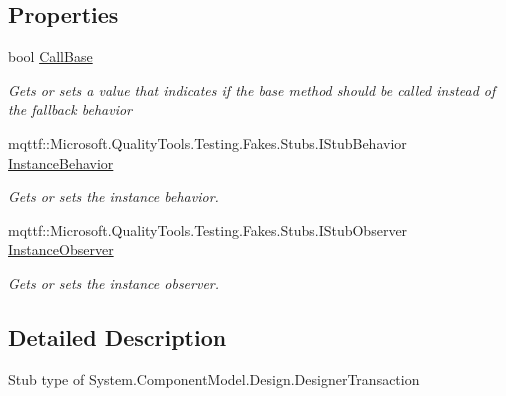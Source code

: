 \subsection*{Properties}
\begin{DoxyCompactItemize}
\item 
bool \hyperlink{class_system_1_1_component_model_1_1_design_1_1_fakes_1_1_stub_designer_transaction_ae23758d21a9026faa0e72d2decfb97fd}{Call\-Base}
\begin{DoxyCompactList}\small\item\em Gets or sets a value that indicates if the base method should be called instead of the fallback behavior\end{DoxyCompactList}\item 
mqttf\-::\-Microsoft.\-Quality\-Tools.\-Testing.\-Fakes.\-Stubs.\-I\-Stub\-Behavior \hyperlink{class_system_1_1_component_model_1_1_design_1_1_fakes_1_1_stub_designer_transaction_abd8526f281b84ad0eefe75ae77ac53ca}{Instance\-Behavior}
\begin{DoxyCompactList}\small\item\em Gets or sets the instance behavior.\end{DoxyCompactList}\item 
mqttf\-::\-Microsoft.\-Quality\-Tools.\-Testing.\-Fakes.\-Stubs.\-I\-Stub\-Observer \hyperlink{class_system_1_1_component_model_1_1_design_1_1_fakes_1_1_stub_designer_transaction_a7621b3c8d10cde8b59d09eb7f789ed7c}{Instance\-Observer}
\begin{DoxyCompactList}\small\item\em Gets or sets the instance observer.\end{DoxyCompactList}\end{DoxyCompactItemize}


\subsection{Detailed Description}
Stub type of System.\-Component\-Model.\-Design.\-Designer\-Transaction



